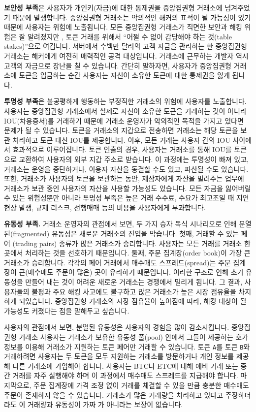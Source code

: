 \documentclass[UTF8,nofonts]{article}
\begin{document}
\begin{multicols}{2}
\textbf{보안성 부족}은 사용자가 개인키(자금)에 대한 통제권을 중앙집권형 거래소에 넘겨주었기 때문에 발생합니다. 중앙집권형 거래소는 악의적인 해커의 표적이 될 가능성이 있기 때문에 사용자는 위험에 노출됩니다. 모든 중앙집권형 거래소가 직면한 보안과 해킹 위험은 잘 알려졌지만 \cite{coincheckhack}  \cite{mcmillan2014inside}, 토큰 거래를 위해서 \enquote{어쩔 수 없이 감당해야 하는 것(table stakes)}으로 여깁니다. 서버에서 수백만 달러의 고객 자금을 관리하는 한 중앙집권형 거래소는 해커에게 여전히 매력적인 공격 대상입니다. 거래소에 근무하는 개발자 역시 고객의 자금으로 장난을 칠 수 있습니다. 간단히 말하자면, 사용자가 중앙집권형 거래소에 토큰을 입금하는 순간 사용자는 자신이 소유한 토큰에 대한 통제권을 잃게 됩니다.

\textbf{투명성 부족}은 불공평하게 행동하는 부정직한 거래소의 위험에 사용자를 노출합니다. 사용자는 중앙집권형 거래소에서 실제로 자신이 소유한 토큰을 거래하는 것이 아니라 IOU(차용증서)를 거래하기 때문에 거래소 운영자가 악의적인 목적을 가지고 있다면 문제가 될 수 있습니다. 토큰을 거래소의 지갑으로 전송하면 거래소는 해당 토큰을 보관 처리하고 토큰 대신 IOU를 제공합니다. 이후, 모든 거래는 사용자 간의 IOU 사이에서 효과적으로 이루어집니다. 토큰 인출의 경우, 사용자는 거래소를 통해 IOU를 토큰으로 교환하여 사용자의 외부 지갑 주소로 받습니다. 이 과정에는 투명성이 빠져 있고, 거래소는 운영을 중단하거나, 이용자 자산을 동결할 수도 있고, 파산될 수도 있습니다. 또한, 거래소가 사용자의 토큰을 보관하는 동안, 제삼자에게 자산을 빌려주는 업무에 거래소가 보관 중인 사용자의 자산을 사용할 가능성도 있습니다. 모든 자금을 잃어버릴 수 있는 위험성뿐만 아니라 투명성 부족은 높은 거래 수수료, 수요가 최고조일 때 지연 현상 발생, 규제 리스크, 선행매매 등의 비용을 사용자에게 부과합니다.

\textbf{유동성 부족.} 거래소 운영자의 관점에서 보면, 두 가지 승자 독식 시나리오로 인해 분열된(fragmented) 유동성은 새로운 거래소의 진입을 막습니다. 첫째, 거래할 수 있는 페어 (trading pairs) 종류가 많은 거래소가 승리합니다. 사용자는 모든 거래를 거래소 한 곳에서 처리하는 것을 선호하기 때문입니다. 둘째, 주문 집계장(order book)이 가장 큰 거래소가 승리합니다. 각각의 페어 거래에서 매수매도 스프레드(spread)는 주문 집계장이 큰(매수매도 주문이 많은) 곳이 유리하기 때문입니다. 이러한 구조로 인해 초기 유동성을 만들어 내는 것이 어려운 새로운 거래소는 경쟁에서 밀리게 됩니다. 그 결과, 사용자들의 불평과 주요 해킹 사고에도 불구하고 많은 거래소가 높은 시장 점유율을 차지하게 되었습니다. 중앙집권형 거래소의 시장 점유율이 높아짐에 따라, 해킹 대상이 될 가능성도 커졌다는 점을 말해두고 싶습니다.

사용자의 관점에서 보면, 분열된 유동성은 사용자의 경험을 많이 감소시킵니다. 중앙집권형 거래소 사용자는 거래소가 보유한 유동성 풀(pool) 안에서 그들이 제공하는 호가 정보를 이용해 거래소가 지원하는 토큰 페어만 거래할 수 있습니다. 토큰 \verb|A|를 토큰 \verb|B|와 거래하려면 사용자는 두 토큰을 모두 지원하는 거래소를 방문하거나 개인 정보를 제공해 다른 거래소에 가입해야 합니다. 사용자는 BTC나 ETC에 대해 예비 거래 또는 중간 거래를 자주 실행해야 하며 이 과정에서 매수매도 스프레드를 지급해야 합니다. 마지막으로, 주문 집계장에 가격 조정 없이 거래를 체결할 수 있을 만큼 충분한 매수매도 주문이 존재하지 않을 수 있습니다. 거래소가 많은 거래량을 처리하고 있다고 주장하더라도 이 거래량과 유동성이 가짜 \cite{fakevolume}가 아니라는 보장이 없습니다.         


\end{multicols}
\end{document}

